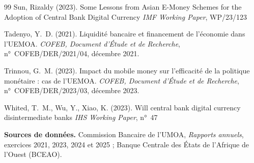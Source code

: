 \documentclass[11pt,a4paper]{article}
\begin{document}
\begin{thebibliography}{99}
		Sun, Rizaldy (2023).
		\newblock Some Lessons from Asian E-Money Schemes for the Adoption of Central Bank Digital Currency 
		\emph{IMF Working Paper}, WP/23/123 
		
		Tadenyo, Y.~D. (2021).
		\newblock Liquidité bancaire et financement de l'économie dans l'UEMOA.
		\newblock \emph{COFEB, Document d'Étude et de Recherche}, n°~COFEB/DER/2021/04, décembre 2021.
		
		Trinnou, G.~M. (2023).
		\newblock Impact du mobile money sur l'efficacité de la politique monétaire : cas de l'UEMOA.
		\newblock \emph{COFEB, Document d'Étude et de Recherche}, n°~COFEB/DER/2023/03, décembre 2023.
		
		Whited, T.~M., Wu, Y., Xiao, K. (2023).
		\newblock Will central bank digital currency disintermediate banks 
		\newblock \emph{IHS Working Paper}, n°~47 
		
		\bigskip
		\noindent\textbf{Sources de données.}
		Commission Bancaire de l'UMOA, \emph{Rapports annuels}, exercices 2021, 2023, 2024 et 2025 ; Banque Centrale des États de l'Afrique de l'Ouest (BCEAO).
		
	\end{thebibliography}
	
\end{document}
